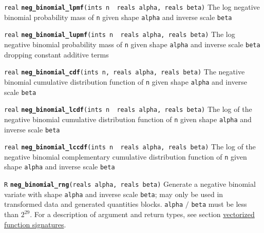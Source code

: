\documentclass[
  10pt,
]{book}
\begin{document}

\texttt{real} \textbf{\texttt{neg\_binomial\_lpmf}}\texttt{(ints\ n\ \textbar{}\ reals\ alpha,\ reals\ beta)}\newline
The log negative binomial probability mass of \texttt{n} given shape \texttt{alpha} and
inverse scale \texttt{beta}


\texttt{real} \textbf{\texttt{neg\_binomial\_lupmf}}\texttt{(ints\ n\ \textbar{}\ reals\ alpha,\ reals\ beta)}\newline
The log negative binomial probability mass of \texttt{n} given shape \texttt{alpha} and
inverse scale \texttt{beta} dropping constant additive terms


\texttt{real} \textbf{\texttt{neg\_binomial\_cdf}}\texttt{(ints\ n,\ reals\ alpha,\ reals\ beta)}\newline
The negative binomial cumulative distribution function of \texttt{n} given
shape \texttt{alpha} and inverse scale \texttt{beta}


\texttt{real} \textbf{\texttt{neg\_binomial\_lcdf}}\texttt{(ints\ n\ \textbar{}\ reals\ alpha,\ reals\ beta)}\newline
The log of the negative binomial cumulative distribution function of \texttt{n}
given shape \texttt{alpha} and inverse scale \texttt{beta}


\texttt{real} \textbf{\texttt{neg\_binomial\_lccdf}}\texttt{(ints\ n\ \textbar{}\ reals\ alpha,\ reals\ beta)}\newline
The log of the negative binomial complementary cumulative distribution
function of \texttt{n} given shape \texttt{alpha} and inverse scale \texttt{beta}


\texttt{R} \textbf{\texttt{neg\_binomial\_rng}}\texttt{(reals\ alpha,\ reals\ beta)}\newline
Generate a negative binomial variate with shape \texttt{alpha} and inverse
scale \texttt{beta}; may only be used in transformed data and generated quantities blocks.
\texttt{alpha} \(/\) \texttt{beta} must be less than \(2 ^ {29}\). For a description of argument and
return types, see section \protect\hyperlink{prob-vectorization}{vectorized function signatures}.
\end{document}
